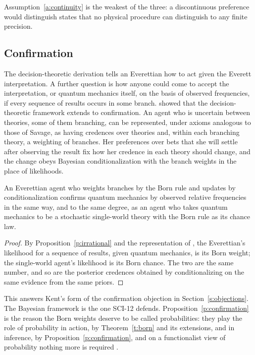 \documentclass{situationist-preprint}
\begin{document}
Assumption~\ref{a:continuity} is the weakest of the three: a discontinuous preference would distinguish states that no physical procedure can distinguish to any finite precision.

\subsection{Confirmation}

The decision-theoretic derivation tells an Everettian how to act given the Everett interpretation. A further question is how anyone could come to accept the interpretation, or quantum mechanics itself, on the basis of observed frequencies, if every sequence of results occurs in some branch. \citet{GreavesMyrvold2010} showed that the decision-theoretic framework extends to confirmation. An agent who is uncertain between theories, some of them branching, can be represented, under axioms analogous to those of Savage, as having credences over theories and, within each branching theory, a weighting of branches. Her preferences over bets that she will settle after observing the result fix how her credence in each theory should change, and the change obeys Bayesian conditionalization with the branch weights in the place of likelihoods.

\begin{proposition}\label{p:confirmation}
An Everettian agent who weights branches by the Born rule and updates by conditionalization confirms quantum mechanics by observed relative frequencies in the same way, and to the same degree, as an agent who takes quantum mechanics to be a stochastic single-world theory with the Born rule as its chance law.
\end{proposition}

\begin{proof}
By Proposition~\ref{p:irrational} and the representation of \citet{GreavesMyrvold2010}, the Everettian's likelihood for a sequence of results, given quantum mechanics, is its Born weight; the single-world agent's likelihood is its Born chance. The two are the same number, and so are the posterior credences obtained by conditionalizing on the same evidence from the same priors.
\end{proof}

This answers Kent's form of the confirmation objection in Section~\ref{s:objections}. The Bayesian framework is the one SCI-12 defends. Proposition~\ref{p:confirmation} is the reason the Born weights deserve to be called probabilities: they play the role of probability in action, by Theorem~\ref{t:born} and its extensions, and in inference, by Proposition~\ref{p:confirmation}, and on a functionalist view of probability nothing more is required \citep{Saunders2010b,Wallace2012}.
\end{document}
